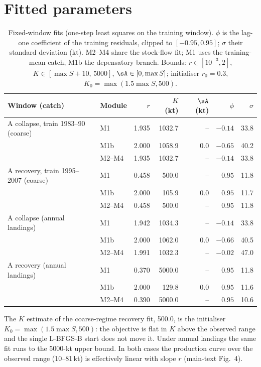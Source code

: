 \FloatBarrier
\section{Fitted parameters}\label{si:params}

\begin{table}[!htb]
\centering\small
\caption{Fixed-window fits (one-step least squares on the training window). $\phi$ is the lag-one coefficient of the training residuals, clipped to $[-0.95,0.95]$; $\sigma$ their standard deviation (kt). M2--M4 share the stock-flow fit; M1 uses the training-mean catch, M1b the depensatory branch. Bounds: $r\in[10^{-3},2]$, $K\in[\max S+10,\,5000]$, $\sA\in[0,\max S]$; initialiser $r_0=0.3$, $K_0=\max(1.5\max S, 500)$.}
\label{tab:si_fixedfits}
\begin{tabular}{@{}llrrrrr@{}}
\toprule
Window (catch) & Module & $r$ & $K$ (kt) & $\sA$ (kt) & $\phi$ & $\sigma$ \\
\midrule
A collapse, train 1983--90 (coarse) & M1 & 1.935 & 1032.7 & -- & $-0.14$ & 33.8 \\
 & M1b & 2.000 & 1058.9 & 0.0 & $-0.65$ & 40.2 \\
 & M2--M4 & 1.935 & 1032.7 & -- & $-0.14$ & 33.8 \\
A recovery, train 1995--2007 (coarse) & M1 & 0.458 & 500.0 & -- & $0.95$ & 11.8 \\
 & M1b & 2.000 & 105.9 & 0.0 & $0.95$ & 11.7 \\
 & M2--M4 & 0.458 & 500.0 & -- & $0.95$ & 11.8 \\
A collapse (annual landings) & M1 & 1.942 & 1034.3 & -- & $-0.14$ & 33.8 \\
 & M1b & 2.000 & 1062.0 & 0.0 & $-0.66$ & 40.5 \\
 & M2--M4 & 1.991 & 1032.3 & -- & $-0.02$ & 47.0 \\
A recovery (annual landings) & M1 & 0.370 & 5000.0 & -- & $0.95$ & 11.8 \\
 & M1b & 2.000 & 129.8 & 0.0 & $0.95$ & 11.6 \\
 & M2--M4 & 0.390 & 5000.0 & -- & $0.95$ & 10.6 \\
\bottomrule
\end{tabular}
\end{table}

The $K$ estimate of the coarse-regime recovery fit, 500.0, is the initialiser $K_0 = \max(1.5\max S, 500)$: the objective is flat in $K$ above the observed range and the single L-BFGS-B start does not move it. Under annual landings the same fit runs to the 5000-kt upper bound. In both cases the production curve over the observed range (10--81\,kt) is effectively linear with slope $r$ (main-text Fig.~4).

